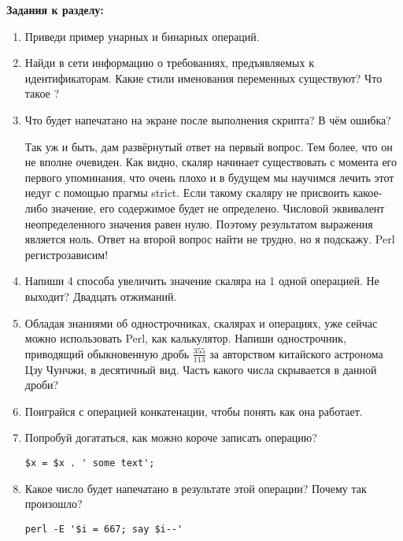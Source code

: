 {\large{\textbf{Задания к разделу:}}}

\begin{enumerate}
\item Приведи пример унарных и бинарных операций.
\item Найди в сети информацию о требованиях, предъявляемых к
идентификаторам. Какие стили именования переменных существуют? Что такое
 ?
\item Что будет напечатано на экране после выполнения скрипта? В чём
ошибка?


Так уж и быть, дам развёрнутый ответ на первый вопрос. Тем более, что он не 
вполне очевиден. Как видно, скаляр начинает существовать с момента его 
первого упоминания, что очень плохо и в будущем мы научимся лечить этот 
недуг с помощью прагмы strict. Если такому скаляру не присвоить какое-либо 
значение, его содержимое будет не определено. Числовой эквивалент 
неопределенного значения равен нулю. Поэтому результатом выражения 
является ноль. Ответ на второй вопрос найти не трудно, но я подскажу. Perl 
регистрозависим!
\item Напиши 4 способа увеличить значение скаляра на 1 одной
операцией. Не выходит? Двадцать отжиманий.
\item Обладая знаниями об однострочниках, скалярах и операциях, уже
сейчас можно использовать Perl, как калькулятор. Напиши однострочник,
приводящий обыкновенную дробь $\frac{355}{113}$ за авторством китайского
астронома Цзу Чунчжи, в десятичный вид. Часть какого числа скрывается в
данной дроби?

\item Поиграйся с операцией конкатенации, чтобы понять как она работает.
\item Попробуй догататься, как можно короче записать операцию?
\begin{verbatim}
$x = $x . ' some text';
\end{verbatim}

\item Какое число будет напечатано в результате этой операции?
  Почему так произошло?
\begin{verbatim}
perl -E '$i = 667; say $i--'
\end{verbatim}
\end{enumerate}
